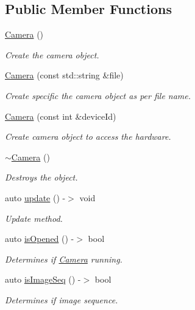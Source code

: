 \subsection*{Public Member Functions}
\begin{DoxyCompactItemize}
\item 
\hyperlink{class_camera_a01f94c3543f56ede7af49dc778f19331}{Camera} ()
\begin{DoxyCompactList}\small\item\em Create the camera object. \end{DoxyCompactList}\item 
\hyperlink{class_camera_ae105913661d2f33f91bdfb5a6ab1db8b}{Camera} (const std\+::string \&file)
\begin{DoxyCompactList}\small\item\em Create specific the camera object as per file name. \end{DoxyCompactList}\item 
\hyperlink{class_camera_a06c600e443fd9222c1fd4c13b9bdfd09}{Camera} (const int \&device\+Id)
\begin{DoxyCompactList}\small\item\em Create camera object to access the hardware. \end{DoxyCompactList}\item 
\hyperlink{class_camera_ad1897942d0ccf91052386388a497349f}{$\sim$\+Camera} ()
\begin{DoxyCompactList}\small\item\em Destroys the object. \end{DoxyCompactList}\item 
auto \hyperlink{class_camera_ae957cc994193c4a367d1e592a16a477f}{update} () -\/$>$ void
\begin{DoxyCompactList}\small\item\em Update method. \end{DoxyCompactList}\item 
auto \hyperlink{class_camera_a635f36e95291ad8962a6b85bf2a12def}{is\+Opened} () -\/$>$ bool
\begin{DoxyCompactList}\small\item\em Determines if \hyperlink{class_camera}{Camera} running. \end{DoxyCompactList}\item 
auto \hyperlink{class_camera_a4e83407793c8388903a37e29925e4bb5}{is\+Image\+Seq} () -\/$>$ bool
\begin{DoxyCompactList}\small\item\em Determines if image sequence. \end{DoxyCompactList}\item 

\end{DoxyCompactItemize}
